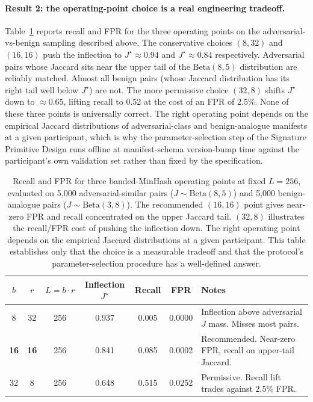 \documentclass[11pt]{article}
\begin{document}
\paragraph{Result 2: the operating-point choice is a real engineering tradeoff.}
Table~\ref{tab:scurve} reports recall and FPR for the three operating points on the adversarial-vs-benign sampling described above. The conservative choices $(8, 32)$ and $(16, 16)$ push the inflection to $J^\star \approx 0.94$ and $J^\star \approx 0.84$ respectively. Adversarial pairs whose Jaccard sits near the upper tail of the $\mathrm{Beta}(8, 5)$ distribution are reliably matched. Almost all benign pairs (whose Jaccard distribution has its right tail well below $J^\star$) are not. The more permissive choice $(32, 8)$ shifts $J^\star$ down to $\approx 0.65$, lifting recall to 0.52 at the cost of an FPR of 2.5\%. None of these three points is universally correct. The right operating point depends on the empirical Jaccard distributions of adversarial-class and benign-analogue manifests at a given participant, which is why the parameter-selection step of the Signature Primitive Design runs offline at manifest-schema version-bump time against the participant's own validation set rather than fixed by the specification.

\renewcommand{\arraystretch}{1.25}
\begin{table}[!htbp]
\centering
\footnotesize
\begin{tabularx}{0.92\textwidth}{@{}c c c c c c X@{}}
\toprule
$b$ & $r$ & $L = b{\cdot}r$ & Inflection $J^\star$ & Recall & FPR & Notes \\
\midrule
8  & 32 & 256 & 0.937 & 0.005  & 0.0000 & Inflection above adversarial $J$ mass. Misses most pairs. \\
\textbf{16} & \textbf{16} & 256 & 0.841 & 0.085  & 0.0002 & Recommended. Near-zero FPR, recall on upper-tail Jaccard. \\
32 & 8  & 256 & 0.648 & 0.515  & 0.0252 & Permissive. Recall lift trades against 2.5\% FPR. \\
\bottomrule
\end{tabularx}
\caption{Recall and FPR for three banded-MinHash operating points at fixed $L = 256$, evaluated on 5{,}000 adversarial-similar pairs ($J \sim \mathrm{Beta}(8, 5)$) and 5{,}000 benign-analogue pairs ($J \sim \mathrm{Beta}(3, 8)$). The recommended $(16, 16)$ point gives near-zero FPR and recall concentrated on the upper Jaccard tail. $(32, 8)$ illustrates the recall/FPR cost of pushing the inflection down. The right operating point depends on the empirical Jaccard distributions at a given participant. This table establishes only that the choice is a measurable tradeoff and that the protocol's parameter-selection procedure has a well-defined answer.}
\label{tab:scurve}
\end{table}
\end{document}

